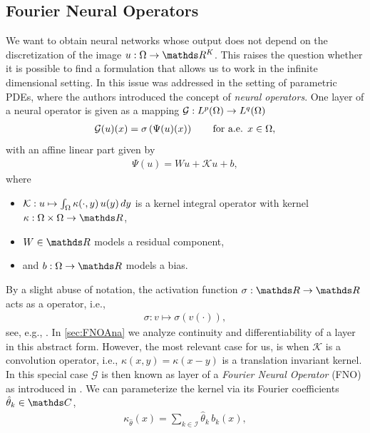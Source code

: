 \subsection{Fourier Neural Operators}
%
%
We want to obtain neural networks whose output does not depend on the discretization of the image $\img:\domain\to\R^K$. This raises the question whether it is possible to find a formulation that allows us to work in the infinite dimensional setting. In \cite{kovachki2021neural} this issue was addressed in the setting of parametric PDEs, where the authors introduced the concept of \emph{neural operators}. One layer of a neural operator is given as a mapping $\mathcal{G}:  L^p(\Omega) \rightarrow L^q(\Omega)$
%
\begin{align}\label{eq:layerdef}
\mathcal{G}(u)(x) = \sigma\left(\Psi(u)(x)\right) \qquad \text{for a.e. } x \in \Omega,
\end{align}
%
with an affine linear part given by
%
\begin{align}\label{eq:linearpart}
\Psi(u) = W u + \mathcal{K}u + b,
\end{align}
%
where
%
\begin{itemize}
\item $\mathcal{K}: u \mapsto \int_{\Omega} \kappa(\cdot, y)\, u(y)\,dy$ is a kernel integral operator with kernel $\kappa: \domain \times \domain \rightarrow \R$,
\item $W \in \R$ models a residual component,
\item and $b: \domain \rightarrow \R$ models a bias.
\end{itemize}
%
%
By a slight abuse of notation, the activation function $\sigma:\R\to\R$ acts as a \Nem{} operator, i.e.,
%
\begin{align}\label{eq:nemytskii}%
\sigma: v \mapsto \sigma(v(\cdot)),
\end{align}
%
see, e.g., \cite{tröltzsch}. In \cref{sec:FNOAna} we analyze continuity and differentiability of a layer in this abstract form. However, the most relevant case for us, is when $\mathcal{K}$ is a convolution operator, i.e., $\kappa(x,y)=\kappa(x-y)$ is a translation invariant kernel. In this special case $\mathcal{G}$ is then known as layer of a \emph{Fourier Neural Operator} (FNO) as introduced in \cite{li2020fourier}. We can parameterize the kernel via its Fourier coefficients $\hat{\param}_k\in\C$,
%
\begin{align}\label{eq:fnokernel}
\kappa_{\hat{\theta}}(x) = \sum_{k \in \mathcal{I}} \hat{\theta}_k\, b_k(x),
\end{align}
